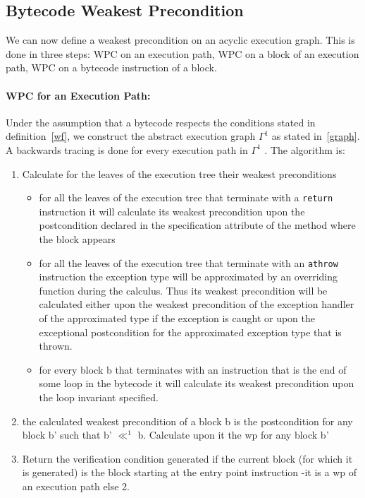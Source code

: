 

\subsection{Bytecode Weakest Precondition}\label{wpGraph}
We can now define a weakest precondition on an acyclic execution graph. This is done in three steps: WPC on an execution path, WPC on a block of an execution path, WPC on a bytecode instruction of a block.
\paragraph{WPC for an Execution Path: }
Under the assumption that a bytecode respects the conditions stated in definition~\ref{wf}, we construct the abstract execution graph $\Gamma^1$ as stated in~\ref{graph}. A backwards tracing is done for every execution path in $\Gamma^1$ . The algorithm is:
\begin{enumerate}
\item Calculate for the leaves of the execution tree their weakest preconditions
    \begin{itemize}
    \item for all the leaves of the execution tree that terminate with a \texttt{return} instruction it will calculate its weakest precondition upon the postcondition declared in the specification attribute of the method where the block appears
    \item for all the leaves of the execution tree that terminate with an \texttt{athrow} instruction the exception type will be approximated by an overriding function during the calculus. Thus its weakest precondition will be calculated either upon the weakest precondition of the exception handler of the approximated type if the exception is caught or upon the exceptional postcondition for the approximated exception type that is thrown.
    \item for every block b that terminates with an instruction that is the end of some loop in the bytecode  it will calculate its weakest precondition upon the loop invariant specified.
    \end{itemize}

\item the calculated weakest precondition of a block b is the postcondition  for any block b' such that b' $\ll^1$ b. Calculate upon it the wp for any  block b'
\item Return the verification condition generated if the current block (for which it is generated) is the block starting at the entry point instruction -it is a wp of an execution path else 2.
\end{enumerate}

